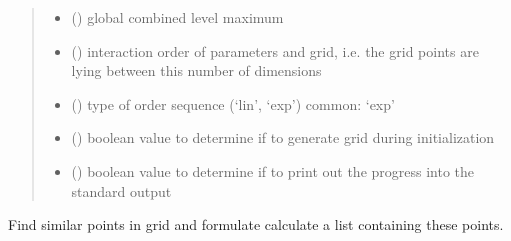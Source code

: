 \documentclass[letterpaper,10pt,english,openany,oneside]{sphinxmanual}
\begin{document}
\begin{fulllineitems}
\begin{quote}
\begin{description}
\begin{itemize}
\item {} 
 () \textendash{} global combined level maximum

\item {} 
 () \textendash{} interaction order of parameters and grid, i.e. the grid points are lying between this number of dimensions

\item {} 
 () \textendash{} type of order sequence (‘lin’, ‘exp’) common: ‘exp’

\item {} 
 (\sphinxstyleliteralemphasis{\sphinxupquote{, }}\sphinxstyleliteralemphasis{\sphinxupquote{, }}) \textendash{} boolean value to determine if to generate grid during initialization

\item {} 
 (\sphinxstyleliteralemphasis{\sphinxupquote{, }}\sphinxstyleliteralemphasis{\sphinxupquote{, }}) \textendash{} boolean value to determine if to print out the progress into the standard output

\end{itemize}

\end{description}\end{quote}

\begin{fulllineitems}
\label{\detokenize{pygpc:pygpc.grid.SparseGrid.calc_coords_weights}}
Find similar points in grid and formulate calculate a list containing these points.

\end{fulllineitems}



\end{fulllineitems}
\end{document}
